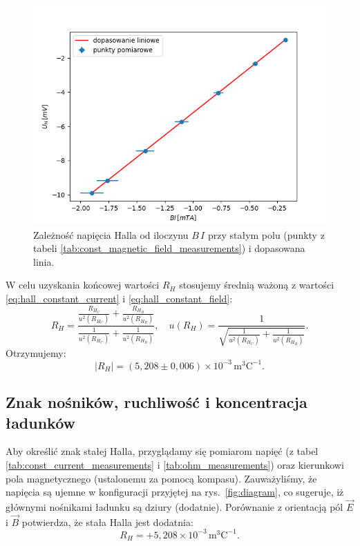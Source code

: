 \documentclass[12pt]{article}
\begin{document}
\begin{figure}[H]
    \centering
    \includegraphics[scale=0.5]{const_field}
    \caption{Zależność napięcia Halla od iloczynu $B\,I$ przy stałym polu (punkty z tabeli \ref{tab:const_magnetic_field_measurements}) i dopasowana linia.}
    \label{fig:const_field_measuremnts}
\end{figure}

W celu uzyskania końcowej wartości $R_H$ stosujemy średnią ważoną z wartości \eqref{eq:hall_constant_current} i \eqref{eq:hall_constant_field}:
\[
    R_H = \frac{\frac{R_{H_C}}{u^2(R_{H_C})} + \frac{R_{H_B}}{u^2(R_{H_B})}}{\frac{1}{u^2(R_{H_C})} + \frac{1}{u^2(R_{H_B})}}, 
    \quad 
    u(R_H) = \frac{1}{\sqrt{\frac{1}{u^2(R_{H_C})} + \frac{1}{u^2(R_{H_B})}}}.
\]
Otrzymujemy:
\begin{equation}
    |R_H| = (5{,}208 \pm 0{,}006)\times 10^{-3}\,\mathrm{m}^3\mathrm{C}^{-1}.
    \label{eq:hall_const}
\end{equation}

\subsection{Znak nośników, ruchliwość i koncentracja ładunków}
Aby określić znak stałej Halla, przyglądamy się pomiarom napięć (z tabel \ref{tab:const_current_measurements} i \ref{tab:ohm_measurements}) oraz kierunkowi pola magnetycznego (ustalonemu za pomocą kompasu). Zauważyliśmy, że napięcia są ujemne w konfiguracji przyjętej na rys.~\ref{fig:diagram}, co sugeruje, iż głównymi nośnikami ładunku są dziury (dodatnie). Porównanie z orientacją pól $\vec{E}$ i $\vec{B}$ potwierdza, że stała Halla jest dodatnia:
\[
    R_H = +5{,}208 \times 10^{-3}\,\mathrm{m}^3\mathrm{C}^{-1}.
\]
\end{document}
